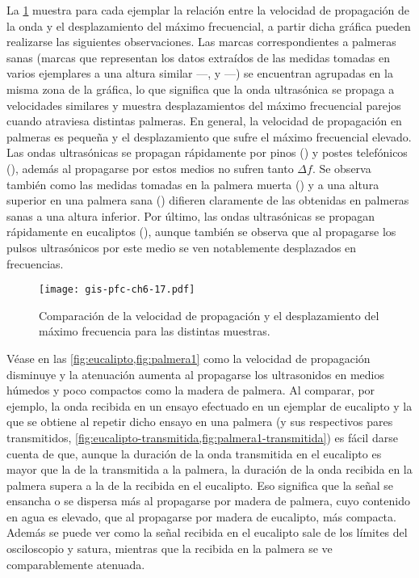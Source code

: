 La \cref{fig:velfreq} muestra para cada ejemplar la relación entre la
velocidad de propagación de la onda y el desplazamiento del máximo
frecuencial, a partir dicha gráfica pueden realizarse las siguientes
observaciones. Las marcas correspondientes a palmeras sanas (marcas que
representan los datos extraídos de las medidas tomadas en varios ejemplares
a una altura similar ---,  y ---) se
encuentran agrupadas en la misma zona de la gráfica, lo que significa que
la onda ultrasónica se propaga a velocidades similares y muestra
desplazamientos del máximo frecuencial parejos cuando atraviesa distintas
palmeras. En general, la velocidad de propagación en palmeras es pequeña y
el desplazamiento que sufre el máximo frecuencial elevado. Las ondas
ultrasónicas se propagan rápidamente por pinos () y postes
telefónicos (), además al propagarse por estos medios no sufren
tanto $\Delta f$. Se observa también como las medidas tomadas en la palmera
muerta () y a una altura superior en una palmera sana
() difieren claramente de las obtenidas en palmeras sanas a una
altura inferior. Por último, las ondas ultrasónicas se propagan rápidamente
en eucaliptos (), aunque también se observa que al propagarse los
pulsos ultrasónicos por este medio se ven notablemente desplazados en
frecuencias.

\begin{figure}
    \begin{center}
	\texttt{[image: gis-pfc-ch6-17.pdf]}
    \end{center}
    \caption[Comparación de la $V_p$ y el $\Delta f$ para las distintas
    muestras.]{Comparación de la velocidad de propagación y el
    desplazamiento del máximo frecuencia para las distintas muestras.}
    \label{fig:velfreq}
\end{figure}

Véase en las \cref{fig:eucalipto,fig:palmera1} como la velocidad de
propagación disminuye y la atenuación aumenta al propagarse los
ultrasonidos en medios húmedos y poco compactos como la madera de palmera.
Al comparar, por ejemplo, la onda recibida en un ensayo efectuado en un
ejemplar de eucalipto y la que se obtiene al repetir dicho ensayo en una
palmera (y sus respectivos pares transmitidos,
\cref{fig:eucalipto-transmitida,fig:palmera1-transmitida}) es fácil darse
cuenta de que, aunque la duración de la onda transmitida en el eucalipto es
mayor que la de la transmitida a la palmera, la duración de la onda
recibida en la palmera supera a la de la recibida en el eucalipto. Eso
significa que la señal se ensancha o se dispersa más al propagarse por
madera de palmera, cuyo contenido en agua es elevado, que al propagarse por
madera de eucalipto, más compacta. Además se puede ver como la señal
recibida en el eucalipto sale de los límites del osciloscopio y satura,
mientras que la recibida en la palmera se ve comparablemente atenuada.

